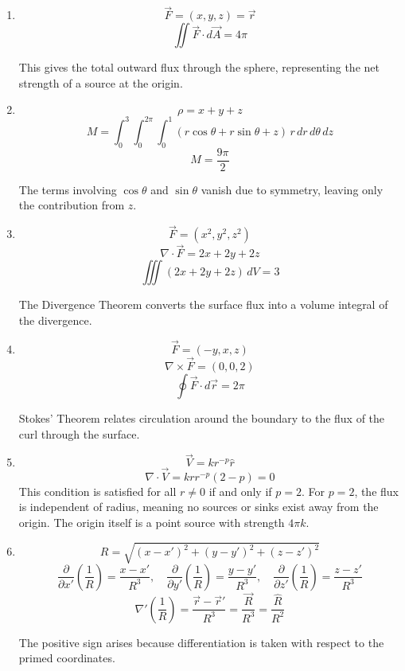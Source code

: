 \documentclass[12pt]{article}
\begin{document}
\begin{enumerate}
\[
\vec{F}=(x,y), \qquad \oint \vec{F}\cdot d\vec{r}
= \int_{AB} + \int_{BC} + \int_{CA}
\]

\textbf{AB:} \; $x=t$, $y=1$, $t\in[0,1]$
\[
\int_{AB} \vec{F}\cdot d\vec{r}
= \int_0^1 t\,dt = \frac{1}{2}
\]

\textbf{BC:} \; $x=1-t$, $y=1-t$, $t\in[0,1]$
\[
\int_{BC} \vec{F}\cdot d\vec{r}
= \int_0^1 -2(1-t)\,dt = -1
\]

\textbf{CA:} \; $x=0$, $y=t$, $t\in[0,1]$
\[
\int_{CA} \vec{F}\cdot d\vec{r}
= \int_0^1 t\,dt = \frac{1}{2}
\]

\[
\oint \vec{F}\cdot d\vec{r}
= \frac{1}{2} - 1 + \frac{1}{2} = 0
\]

\[
\vec{F} = \nabla\!\left(\frac{x^2+y^2}{2}\right)
\;\Rightarrow\;
\oint \vec{F}\cdot d\vec{r} = 0
\]


\item 
\[
\vec{F}=(x,y,z)=\vec{r}
\]
\[
\iint \vec{F}\cdot d\vec{A} = 4\pi
\]

This gives the total outward flux through the sphere, representing the net strength of a source at the origin.

\item 
\[
\rho = x+y+z
\]
\[
M = \int_0^3 \int_0^{2\pi} \int_0^1 (r\cos\theta + r\sin\theta + z)\, r\,dr\,d\theta\,dz
\]
\[
M = \frac{9\pi}{2}
\]

The terms involving $\cos\theta$ and $\sin\theta$ vanish due to symmetry, leaving only the contribution from $z$.

\item 
\[
\vec{F}=(x^2,y^2,z^2)
\]
\[
\nabla \cdot \vec{F} = 2x+2y+2z
\]
\[
\iiint (2x+2y+2z)\,dV = 3
\]

The Divergence Theorem converts the surface flux into a volume integral of the divergence.

\item 
\[
\vec{F}=(-y,x,z)
\]
\[
\nabla \times \vec{F} = (0,0,2)
\]
\[
\oint \vec{F}\cdot d\vec{r} = 2\pi
\]

Stokes' Theorem relates circulation around the boundary to the flux of the curl through the surface.

\item 
\[
\vec{V} = k r^{-p}\hat{r}
\]
\[
\nabla \cdot \vec{V} = k r r^{-p} \left(2 - p\right) = 0
\]
This condition is satisfied for all $r\neq 0$ if and only if $p=2$. For $p=2$, the flux is independent of radius, meaning no sources or sinks exist away from the origin. The origin itself is a point source with strength $4\pi k$.

\item 
\[
R = \sqrt{(x-x')^2+(y-y')^2+(z-z')^2}
\]
\[
\frac{\partial}{\partial x'}\left(\frac{1}{R}\right)
= \frac{x-x'}{R^3}, \quad
\frac{\partial}{\partial y'}\left(\frac{1}{R}\right)
= \frac{y-y'}{R^3}, \quad
\frac{\partial}{\partial z'}\left(\frac{1}{R}\right)
= \frac{z-z'}{R^3}
\]
\[
\nabla' \left(\frac{1}{R}\right)
= \frac{\vec{r}-\vec{r}'}{R^3}
= \frac{\vec{R}}{R^3}
= \frac{\hat{R}}{R^2}
\]

The positive sign arises because differentiation is taken with respect to the primed coordinates.

\end{enumerate}
\end{document}
